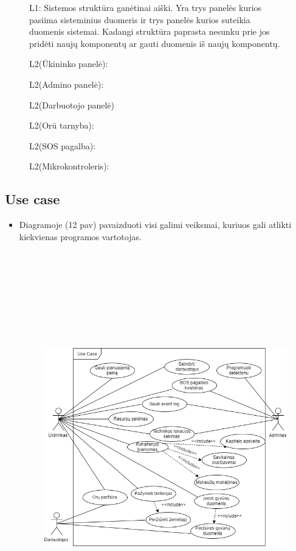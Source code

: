 \documentclass[oneside]{VUMIFPSkursinis}
\begin{document}
\begin{itemize}
\begin{figure}[H]
\item L1: Sistemos struktūra ganėtinai aiški. Yra trys panelės kurios pasiima sisteminius duomeris ir trys panelės kurios suteikia duomenis sistemai. Kadangi struktūra paprasta nesunku prie jos pridėti naujų komponentų ar gauti duomenis iš naujų komponentų.

\item L2(Ūkininko panelė):
\item L2(Admino panelė):
\item L2(Darbuotojo panelė)
\item L2(Orū tarnyba):
\item L2(SOS pagalba):
\item L2(Mikrokontroleris):


\end{figure}
\end{itemize}
\subsection{Use case}
\begin{itemize}
\item Diagramoje (12 pav) pavaizduoti visi galimi veiksmai, kuriuos gali atlikti kiekvienas programos vartotojas.
		\begin{figure}[H]
		\centering	
	\includegraphics[width=15cm,height=17cm,keepaspectratio]{UseCaseFull.png}
	\caption{}
	\label{fig:UseCaseFull}
\end{figure}
\end{itemize}
\end{document}
